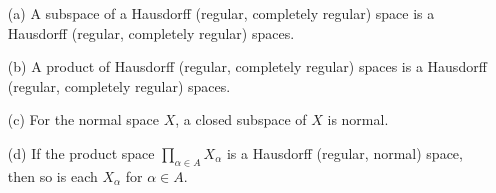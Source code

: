 \begin{prop}
    \begin{enumerate}
        \item[(a)]
        {
            A subspace of a Hausdorff (regular, completely regular) space is a Hausdorff (regular, completely regular) spaces.
        }
        \item[(b)]
        {
            A product of Hausdorff (regular, completely regular) spaces is a Hausdorff (regular, completely regular) spaces.
        }
        \item[(c)]
        {
            For the normal space $X$, a closed subspace of $X$ is normal.
        }
        \item[(d)]
        {
            If the product space $\prod_{\alpha\in A}X_\alpha$ is a Hausdorff (regular, normal) space, then so is each $X_\alpha$ for $\alpha\in A$.\label{converse inheritance}
        }
    \end{enumerate}
\end{prop}
